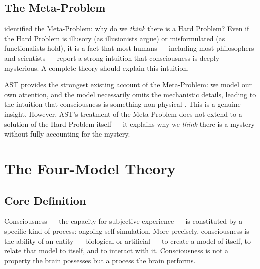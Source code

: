 \documentclass[12pt]{article}
\begin{document}
\subsection{The Meta-Problem}


\citet{Chalmers2018} identified the Meta-Problem: why do we \emph{think} there is a Hard Problem? Even if the Hard Problem is illusory (as illusionists argue) or misformulated (as functionalists hold), it is a fact that most humans --- including most philosophers and scientists --- report a strong intuition that consciousness is deeply mysterious. A complete theory should explain this intuition.

AST provides the strongest existing account of the Meta-Problem: we model our own attention, and the model necessarily omits the mechanistic details, leading to the intuition that consciousness is something non-physical \citep{Graziano2013}. This is a genuine insight. However, AST's treatment of the Meta-Problem does not extend to a solution of the Hard Problem itself --- it explains why we \emph{think} there is a mystery without fully accounting for the mystery.



\section{The Four-Model Theory}



\subsection{Core Definition}


Consciousness --- the capacity for subjective experience --- is constituted by a specific kind of process: ongoing self-simulation. More precisely, consciousness is the ability of an entity --- biological or artificial --- to create a model of itself, to relate that model to itself, and to interact with it. Consciousness is not a property the brain possesses but a process the brain performs.
\end{document}

